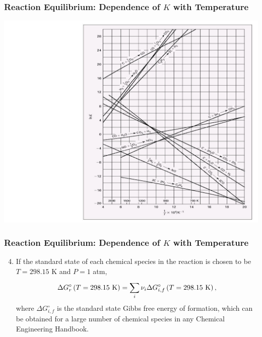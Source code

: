 \documentclass[10pt,compress,handout,unknownkeysallowed]{beamer}
\begin{document}
\begin{frame}
  \frametitle{Reaction Equilibrium:  Dependence of $K$ with Temperature } 
     \begin{center}
          \includegraphics[width=.95\columnwidth,height=0.65\columnwidth,clip]{./../Pics/ChemicalReactions_EquilConstPlotb} 
     \end{center} 

\end{frame}
\begin{frame}
  \frametitle{Reaction Equilibrium:  Dependence of $K$ with Temperature } 

      \begin{enumerate} \setcounter{enumi}{3} 
         \item<1-> If the standard state of each chemical species in the reaction is chosen to be $T=298.15$ K and $P= 1$ atm,
         \begin{displaymath}
              \Delta G_{r}^{\circ} \left(T=298.15\text{ K}\right) = \summation[\nu_{i}\Delta G_{i,f}^{\circ}\left(T=298.15\text{ K}\right)]{i}{},
         \end{displaymath}
         where $\Delta G_{i,f}^{\circ}$ is the standard state Gibbs free energy of formation, which can be obtained for a large number of chemical species in any Chemical Engineering Handbook.
      \end{enumerate}

\end{frame}
\end{document}
